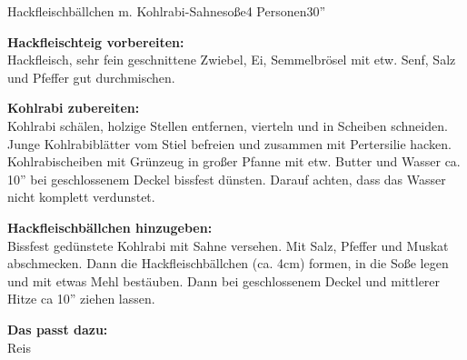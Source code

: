 \begin{MyRecipe}{Hackfleischbällchen m. Kohlrabi-Sahnesoße}{4 Personen}{30''}
	
	
	
	\textbf{Hackfleischteig vorbereiten:}\\
	Hackfleisch, sehr fein geschnittene Zwiebel, Ei, Semmelbrösel mit etw. Senf, Salz und Pfeffer gut durchmischen.\par\bigskip

	\textbf{Kohlrabi zubereiten:}\\
	Kohlrabi schälen, holzige Stellen entfernen, vierteln und in Scheiben schneiden. Junge Kohlrabiblätter vom Stiel befreien und zusammen mit Pertersilie hacken. Kohlrabischeiben mit Grünzeug in großer Pfanne mit etw. Butter und Wasser ca. 10'' bei geschlossenem Deckel bissfest dünsten. Darauf achten, dass das Wasser nicht komplett verdunstet.\par\bigskip
	
	\textbf{Hackfleischbällchen hinzugeben:}\\
	Bissfest gedünstete Kohlrabi mit Sahne versehen. Mit Salz, Pfeffer und Muskat abschmecken. Dann die Hackfleischbällchen (ca. 4cm) formen, in die Soße legen und mit etwas Mehl bestäuben. Dann bei geschlossenem Deckel und mittlerer Hitze ca 10'' ziehen lassen.\par\bigskip
	
	\textbf{Das passt dazu:}\\
	Reis
	
\end{MyRecipe}